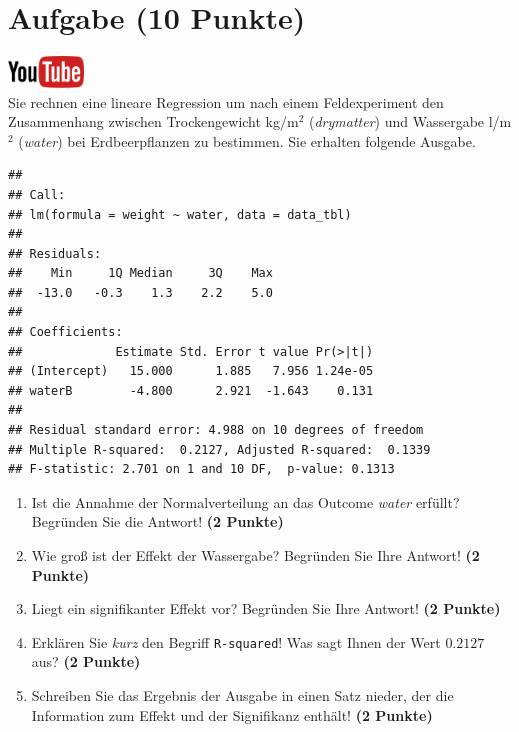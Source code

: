 \documentclass[a4paper, 10pt]{scrartcl}\usepackage[]{graphicx}\usepackage[]{xcolor}
\makeatletter
\newenvironment{kframe}{%
 \def\at@end@of@kframe{}%
 \ifinner\ifhmode%
  \def\at@end@of@kframe{\end{minipage}}%
  \begin{minipage}{\columnwidth}%
 \fi\fi%
 \def\FrameCommand##1{\hskip\@totalleftmargin \hskip-\fboxsep
 \colorbox{shadecolor}{##1}\hskip-\fboxsep
     \hskip-\linewidth \hskip-\@totalleftmargin \hskip\columnwidth}%
 \MakeFramed {\advance\hsize-\width
   \@totalleftmargin\z@ \linewidth\hsize
   \@setminipage}}%
 {\par\unskip\endMakeFramed%
 \at@end@of@kframe}
\newenvironment{knitrout}{}{} %
\makeatother
\begin{document}
\section{Aufgabe \hfill (10 Punkte)}

\hfill\href{https://youtu.be/tNNzcndrpSk}{\includegraphics[width =
  2cm]{img/youtube}}\\[1Ex]

Sie rechnen eine lineare Regression um nach einem Feldexperiment den
Zusammenhang zwischen Trockengewicht kg/m$^2$ (\textit{drymatter}) und
Wassergabe l/m$^2$ (\textit{water}) bei Erdbeerpflanzen zu bestimmen. Sie
erhalten folgende \Rlogo Ausgabe.

\begin{knitrout}
\color{fgcolor}\begin{kframe}
\begin{verbatim}
## 
## Call:
## lm(formula = weight ~ water, data = data_tbl)
## 
## Residuals:
##    Min     1Q Median     3Q    Max 
##  -13.0   -0.3    1.3    2.2    5.0 
## 
## Coefficients:
##             Estimate Std. Error t value Pr(>|t|)
## (Intercept)   15.000      1.885   7.956 1.24e-05
## waterB        -4.800      2.921  -1.643    0.131
## 
## Residual standard error: 4.988 on 10 degrees of freedom
## Multiple R-squared:  0.2127,	Adjusted R-squared:  0.1339 
## F-statistic: 2.701 on 1 and 10 DF,  p-value: 0.1313
\end{verbatim}
\end{kframe}
\end{knitrout}


\begin{enumerate}
\item Ist die Annahme der Normalverteilung an das Outcome \textit{water}
  erf{\"u}llt?  Begr{\"u}nden Sie die Antwort! \textbf{(2 Punkte)}
\item Wie gro{\ss} ist der Effekt der Wassergabe?  Begr{\"u}nden Sie Ihre Antwort! \textbf{(2 Punkte)} 
\item Liegt ein signifikanter
  Effekt vor? Begr{\"u}nden Sie Ihre Antwort! \textbf{(2 Punkte)}
\item Erkl{\"a}ren Sie \textit{kurz} den Begriff \texttt{R-squared}!
  Was sagt Ihnen der Wert $0.2127$ aus? \textbf{(2 Punkte)}
\item Schreiben Sie das Ergebnis der \Rlogo Ausgabe in einen Satz nieder, der die
  Information zum Effekt und der Signifikanz enth{\"a}lt! \textbf{(2 Punkte)} 
\end{enumerate}
 
\end{document}
